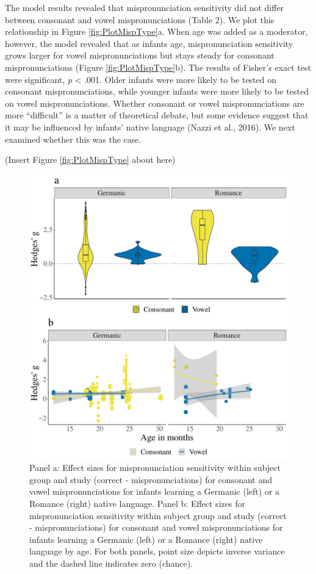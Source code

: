 \documentclass[
  english,
  man, noextraspace]{apa6}
\begin{document}
The model results revealed that mispronunciation sensitivity did not differ between consonant and vowel mispronunciations (Table 2). We plot this relationship in Figure \ref{fig:PlotMispType}a. When age was added as a moderator, however, the model revealed that as infants age, mispronunciation sensitivity grows larger for vowel mispronunciations but stays steady for consonant mispronunciations (Figure \ref{fig:PlotMispType}b). The results of Fisher's exact test were significant, \emph{p} \textless{} .001. Older infants were more likely to be tested on consonant mispronunciations, while younger infants were more likely to be tested on vowel mispronunciations. Whether consonant or vowel mispronunciations are more ``difficult'' is a matter of theoretical debate, but some evidence suggest that it may be influenced by infants' native language (Nazzi et al., 2016). We next examined whether this was the case.

(Insert Figure \ref{fig:PlotMispType} about here)

\begin{figure}
\centering
\includegraphics{VonHolzenBergmann_MPMetaAnalysis_files/figure-latex/PlotCVEffectLang-1.pdf}
\caption{\label{fig:PlotCVEffectLang}Panel a: Effect sizes for mispronunciation sensitivity within subject group and study (correct - mispronunciations) for consonant and vowel mispronunciations for infants learning a Germanic (left) or a Romance (right) native language. Panel b: Effect sizes for mispronunciation sensitivity within subject group and study (correct - mispronunciations) for consonant and vowel mispronunciations for infants learning a Germanic (left) or a Romance (right) native language by age. For both panels, point size depicts inverse variance and the dashed line indicates zero (chance).}
\end{figure}
\end{document}
